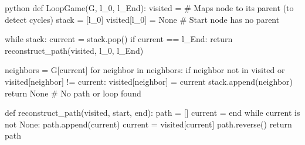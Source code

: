 python
def LoopGame(G, l_0, l_End):
    visited = {}  # Maps node to its parent (to detect cycles)
    stack = [l_0]
    visited[l_0] = None  # Start node has no parent
    
    while stack:
        current = stack.pop()
        if current == l_End:
            return reconstruct_path(visited, l_0, l_End)
        
        neighbors = G[current]
        for neighbor in neighbors:
            if neighbor not in visited or visited[neighbor] != current:
                visited[neighbor] = current
                stack.append(neighbor)
    return None  # No path or loop found

def reconstruct_path(visited, start, end):
    path = []
    current = end
    while current is not None:
        path.append(current)
        current = visited[current]
    path.reverse()
    return path